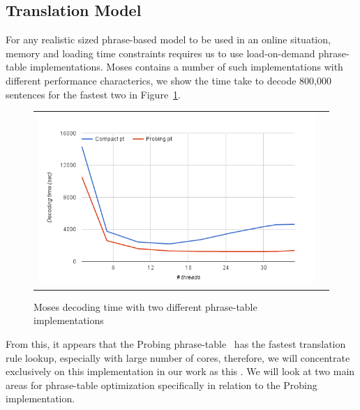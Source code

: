 \documentclass[11pt]{article}
\begin{document}
\subsection{Translation Model}

For any realistic sized phrase-based model to be used in an online situation, memory and loading time constraints requires us to use load-on-demand phrase-table implementations. Moses contains a number of such implementations with different performance characterics, we show the time take to decode 800,000 sentences for the fastest two in Figure~\ref{fig:moses-phrase-tables-time}.
\begin{figure}[h]
\centering
\begin{tabular}{cc}
{\includegraphics[scale=0.4]{moses-phrase-table.png}} 
\end{tabular}
\caption{Moses decoding time with two different phrase-table implementations}
\label{fig:moses-phrase-tables-time}
\end{figure} 
From this, it appears that the Probing phrase-table~\cite{Bogochev:Thesis:2013} has the fastest translation rule lookup, especially with large number of cores, therefore, we will concentrate exclusively on this implementation in our work as this . We will look at two main areas for phrase-table optimization specifically in relation to the Probing implementation.
\end{document}
